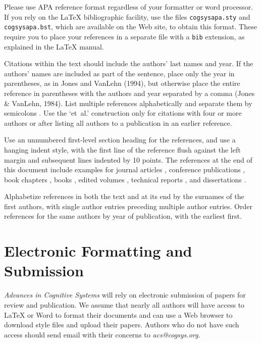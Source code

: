 \documentclass[11pt,letterpaper]{article}
\begin{document}
Please use APA reference format regardless of your formatter or word
processor. If you rely on the \LaTeX\/ bibliographic facility, use the 
files {\tt\small cogsysapa.sty} and {\tt\small cogsysapa.bst}, which
are available on the Web site, to obtain this format. These require
you to place your references in a separate file with a {\tt\small bib}
extension, as explained in the \LaTeX\/ manual.

Citations within the text should include the authors' last names and
year. If the authors' names are included as part of the sentence, place 
only the year in parentheses, as in Jones and VanLehn (1994), but 
otherwise place the entire reference in parentheses with the authors
and year separated by a comma (Jones \& VanLehn, 1984). 
List multiple references alphabetically and separate them by semicolons 
\cite{paper-laird-etal,book-newell-simon}. Use the 
`et~al.'  construction only for citations with four or more authors or
after listing all authors to a publication in an earlier reference.

Use an unnumbered first-level section heading for the references, and 
use a hanging indent style, with the first line of the reference flush
against the left margin and subsequent lines indented by 10 points. 
The references at the end of this document include examples for journal
articles , conference publications ,
book chapters , books , 
edited volumes , technical reports 
, and dissertations .

Alphabetize references in both the text and at its end by the surnames
of the first authors, with single author entries preceding multiple
author entries. Order references for the same authors by year of
publication, with the earliest first.

\section{Electronic Formatting and Submission}

{\it Advances in Cognitive Systems\/} will rely on electronic submission 
of papers for review and publication. We assume that nearly all authors 
will have access to \LaTeX\/ or Word to format their documents and can
use a Web browser to download style files and upload their papers. 
Authors who do not have such access should send email with their
concerns to {\sl acs@cogsys.org}.
\end{document}

